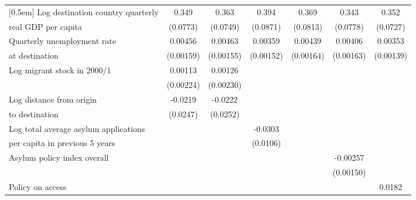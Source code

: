 \begin{table}[!ht]
\begin{tabular}{l*{6}{c}}
[0.5em]
Log destination country quarterly &       0.349\sym{***}&       0.363\sym{***}&       0.394\sym{***}&       0.369\sym{***}&       0.343\sym{***}&       0.352\sym{***}\\
real GDP per capita                    &    (0.0773)         &    (0.0749)         &    (0.0871)         &    (0.0813)         &    (0.0778)         &    (0.0727)         \\
[0.5em]
Quarterly unemployment rate &     0.00456\sym{**} &     0.00463\sym{**} &     0.00359\sym{*}  &     0.00439\sym{*}  &     0.00406\sym{*}  &     0.00353\sym{*}  \\
at destination                    &   (0.00159)         &   (0.00155)         &   (0.00152)         &   (0.00164)         &   (0.00163)         &   (0.00139)         \\
[0.5em]
Log migrant stock in 2000/1&     0.00113         &     0.00126         &                     &                     &                     &                     \\
                    &   (0.00224)         &   (0.00230)         &                     &                     &                     &                     \\
[0.5em]
Log distance from origin &     -0.0219         &     -0.0222         &                     &                     &                     &                     \\
to destination                    &    (0.0247)         &    (0.0252)         &                     &                     &                     &                     \\
[0.5em]
Log total average asylum applications &                     &                     &     -0.0303\sym{**} &                     &                     &                     \\
per capita in previous 5 years                    &                     &                     &    (0.0106)         &                     &                     &                     \\
[0.5em]
Asylum policy index overall&                     &                     &                     &                     &    -0.00257         &                     \\
                    &                     &                     &                     &                     &   (0.00150)         &                     \\
[0.5em]
Policy on access    &                     &                     &                     &                     &                     &      0.0182\sym{***}\\

\end{tabular}
\end{table}
